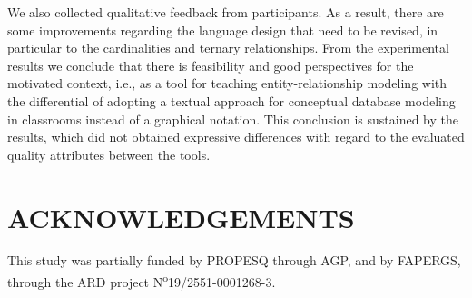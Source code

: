\documentclass[a4paper,twoside,anonymous]{article}
\begin{document}
We also collected qualitative feedback from participants. 
As a result, there are some improvements regarding the language design that need to be revised, in particular to the cardinalities and ternary relationships.
From the experimental results we conclude that there is feasibility and good perspectives for the motivated context, i.e., as a  tool for teaching entity-relationship modeling with the differential of adopting a textual approach for conceptual database modeling in classrooms instead of a graphical notation. 
This conclusion is sustained by the results, which did not obtained expressive differences with regard to the evaluated quality attributes between the tools.

\section*{\uppercase{Acknowledgements}}
\noindent This study was partially funded by PROPESQ through AGP, and by FAPERGS, through the ARD project N\textsuperscript{\underline{o}}19/2551-0001268-3.



{\small
}



\end{document}
